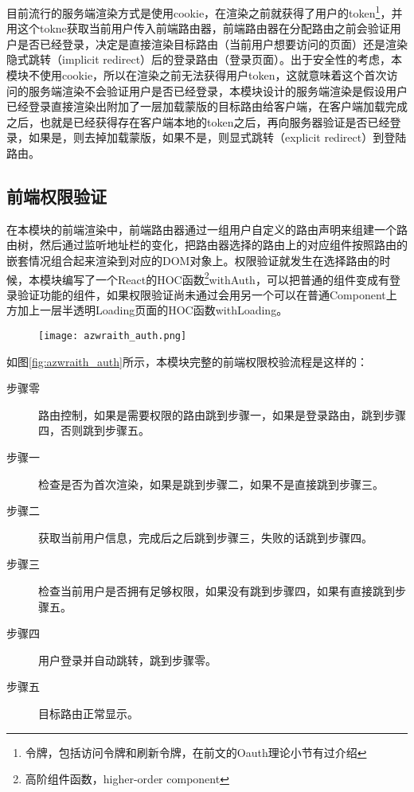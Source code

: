 目前流行的服务端渲染方式是使用cookie，在渲染之前就获得了用户的token\footnote{令牌，包括访问令牌和刷新令牌，在前文的Oauth理论小节有过介绍}，并用这个tokne获取当前用户传入前端路由器，前端路由器在分配路由之前会验证用户是否已经登录，决定是直接渲染目标路由（当前用户想要访问的页面）还是渲染隐式跳转（implicit redirect）后的登录路由（登录页面）。出于安全性的考虑，本模块不使用cookie，所以在渲染之前无法获得用户token，这就意味着这个首次访问的服务端渲染不会验证用户是否已经登录，本模块设计的服务端渲染是假设用户已经登录直接渲染出附加了一层加载蒙版的目标路由给客户端，在客户端加载完成之后，也就是已经获得存在客户端本地的token之后，再向服务器验证是否已经登录，如果是，则去掉加载蒙版，如果不是，则显式跳转（explicit redirect）到登陆路由。

\subsection{前端权限验证}
在本模块的前端渲染中，前端路由器通过一组用户自定义的路由声明来组建一个路由树，然后通过监听地址栏的变化，把路由器选择的路由上的对应组件按照路由的嵌套情况组合起来渲染到对应的DOM对象上。权限验证就发生在选择路由的时候，本模块编写了一个React的HOC函数\footnote{高阶组件函数，higher-order component}withAuth，可以把普通的组件变成有登录验证功能的组件，如果权限验证尚未通过会用另一个可以在普通Component上方加上一层半透明Loading页面的HOC函数withLoading。

\begin{figure}[!htp]
 \centering
 \texttt{[image: azwraith\_auth.png]}
\end{figure}
如图\ref{fig:azwraith_auth}所示，本模块完整的前端权限校验流程是这样的：
\begin{description}
  \item[步骤零] 路由控制，如果是需要权限的路由跳到步骤一，如果是登录路由，跳到步骤四，否则跳到步骤五。
  \item[步骤一] 检查是否为首次渲染，如果是跳到步骤二，如果不是直接跳到步骤三。
  \item[步骤二] 获取当前用户信息，完成后之后跳到步骤三，失败的话跳到步骤四。
  \item[步骤三] 检查当前用户是否拥有足够权限，如果没有跳到步骤四，如果有直接跳到步骤五。
  \item[步骤四] 用户登录并自动跳转，跳到步骤零。
  \item[步骤五] 目标路由正常显示。
\end{description}

